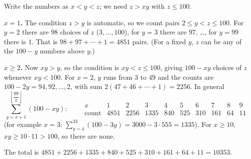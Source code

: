 Write the numbers as $x<y<z$; we need $z>xy$ with $z\le100$.

\textbf{$x=1$.} The condition $z>y$ is automatic, so we count pairs $2\le y<z\le100$. For $y=2$ there are $98$ choices of $z$ ($3,\dots,100$), for $y=3$ there are $97$, \dots, for $y=99$ there is $1$. That is $98+97+\cdots+1=4851$ pairs. (For a fixed $y$, $z$ can be any of the $100-y$ numbers above $y$.)

\textbf{$x\ge2$.} Now $xy>y$, so the condition is $xy<z\le100$, giving $100-xy$ choices of $z$ whenever $xy<100$. For $x=2$, $y$ runs from $3$ to $49$ and the counts are $100-2y=94,92,\dots,2$, with sum $2(47+46+\cdots+1)=2256$. In general
\[
\sum_{y=x+1}^{\left\lfloor\dfrac{99}{x}\right\rfloor}(100-xy):\qquad
\begin{array}{c|ccccccccc}
x&1&2&3&4&5&6&7&8&9\\\hline
\text{count}&4851&2256&1335&840&525&310&161&64&11
\end{array}
\]
(for example $x=3$: $\sum_{y=4}^{33}(100-3y)=3000-3\cdot555=1335$). For $x\ge10$, $xy\ge10\cdot11>100$, so there are none.

The total is $4851+2256+1335+840+525+310+161+64+11=\boxed{10353}$.
